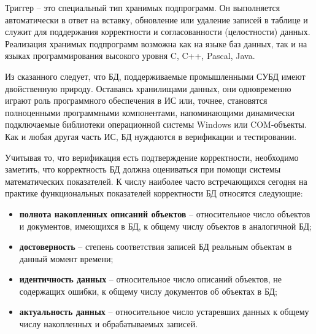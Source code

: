 Триггер – это специальный тип хранимых подпрограмм. Он выполняется автоматически в ответ на вставку, обновление
или удаление записей в таблице и служит для поддержания корректности и согласованности (целостности) данных.
Реализация хранимых подпрограмм возможна как на языке баз данных, так и на языках программирования высокого уровня
C, C++, Pascal, Java.

Из сказанного следует, что БД, поддерживаемые промышленными СУБД имеют двойственную природу. Оставаясь хранилищами
данных, они одновременно играют роль программного обеспечения в ИС или, точнее, становятся полноценными программными
компонентами, напоминающими динамически подключаемые библиотеки операционной системы Windows или COM-объекты.
Как и любая другая часть ИС, БД нуждаются в верификации и тестировании.

Учитывая то, что верификация есть подтверждение корректности, необходимо заметить, что корректность БД
должна оцениваться при помощи системы математических показателей. К числу наиболее часто встречающихся сегодня на
практике функциональных показателей корректности БД относятся следующие:
\begin{itemize}
    \item \textbf{полнота накопленных описаний объектов} – относительное число объектов и документов, имеющихся
    в БД, к общему числу объектов в аналогичной БД;

    \item \textbf{достоверность} – степень соответствия записей БД реальным объектам в данный момент времени;

    \item \textbf{идентичность данных} – относительное число описаний объектов, не содержащих ошибки,
    к общему числу документов об объектах в БД;

    \item \textbf{актуальность данных} – относительное число устаревших данных к общему числу накопленных
    и обрабатываемых записей.
\end{itemize}

